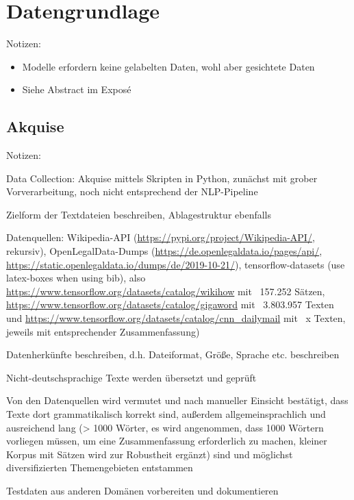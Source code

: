 \chapter{Datengrundlage}
\thispagestyle{fancy}
\label{chap:Datengrundlage}

Notizen:
\begin{itemize}
	\item Modelle erfordern keine gelabelten Daten, wohl aber gesichtete Daten	
	\item Siehe Abstract im Exposé
\end{itemize}


\section{Akquise}
Notizen:
	\item Data Collection: Akquise mittels Skripten in Python, zunächst mit grober Vorverarbeitung, noch nicht entsprechend der NLP-Pipeline
	\item Zielform der Textdateien beschreiben, Ablagestruktur ebenfalls
	\item Datenquellen: Wikipedia-API (\url{https://pypi.org/project/Wikipedia-API/}, rekursiv), OpenLegalData-Dumps (\url{https://de.openlegaldata.io/pages/api/}, \url{https://static.openlegaldata.io/dumps/de/2019-10-21/}), tensorflow-datasets (use latex-boxes when using bib), also \url{https://www.tensorflow.org/datasets/catalog/wikihow} mit ~157.252 Sätzen, \url{https://www.tensorflow.org/datasets/catalog/gigaword} mit ~3.803.957 Texten und \url{https://www.tensorflow.org/datasets/catalog/cnn_dailymail} mit ~x Texten, jeweils mit entsprechender Zusammenfassung)
	\item Datenherkünfte beschreiben, d.h. Dateiformat, Größe, Sprache etc. beschreiben
	\item Nicht-deutschsprachige Texte werden übersetzt und geprüft
	\item Von den Datenquellen wird vermutet und nach manueller Einsicht bestätigt, dass Texte dort grammatikalisch korrekt sind, außerdem allgemeinsprachlich und ausreichend lang (> 1000 Wörter, es wird angenommen, dass 1000 Wörtern vorliegen müssen, um eine Zusammenfassung erforderlich zu machen, kleiner Korpus mit Sätzen wird zur Robustheit ergänzt) sind und möglichst diversifizierten Themengebieten entstammen
	\item Testdaten aus anderen Domänen vorbereiten und dokumentieren


